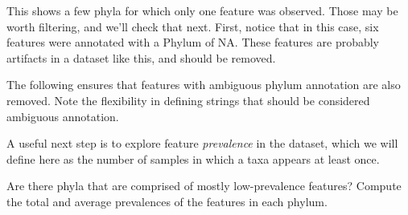 This shows a few phyla for which only one feature was observed.
Those may be worth filtering, and we'll check that next.
First, notice that in this case, six features were annotated with a Phylum of NA.
These features are probably artifacts in a dataset like this,
and should be removed.

The following ensures that features with ambiguous phylum annotation are also removed.
Note the flexibility in defining strings that should be considered ambiguous annotation.

\begin{knitrout}
\color{fgcolor}
\end{knitrout}

A useful next step is to explore feature \emph{prevalence} in the dataset,
which we will define here as
the number of samples in which a taxa appears at least once.

\begin{knitrout}
\color{fgcolor}\begin{kframe}
\begin{alltt}
 \hlkwb{=} \hlstd{(} \hlstd{=} 
                \hlstd{=} \hlstd{(}  \hlstd{=} \hlstd{,}  \hlstd{=} \hlstd{),}
                \hlstd{=} \hlstd{(}\hlstd{)\{} \hlopt{>} \hlstd{)\})}
 \hlkwb{=} \hlstd{(} 
                     \hlstd{=} 
\end{alltt}
\end{kframe}
\end{knitrout}


Are there phyla that are comprised of mostly low-prevalence features?
Compute the total and average prevalences of the features in each phylum.

